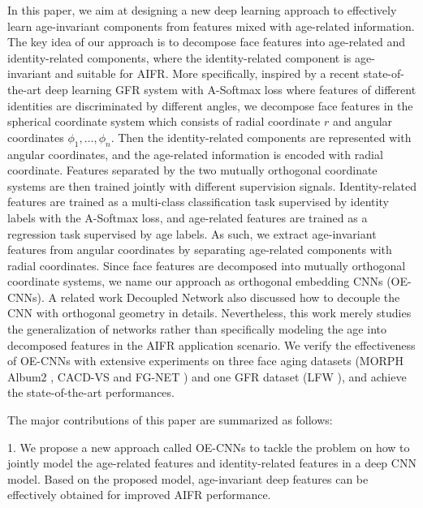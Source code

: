 \documentclass[runningheads]{llncs}
\begin{document}
In this paper, we aim at designing a new deep learning approach to effectively learn age-invariant components from features mixed with age-related information. The key idea of our approach is to decompose face features into age-related and identity-related components, where the identity-related component is age-invariant and suitable for AIFR. More specifically, inspired by a recent state-of-the-art deep learning GFR system with A-Softmax loss \cite{sphereface} where features of different identities are discriminated by different angles, we decompose face features in the spherical coordinate system which consists of radial coordinate $r$ and angular coordinates $\phi_1,\dots,\phi_{n}$. Then the identity-related components are represented with angular coordinates, and the age-related information is encoded with radial coordinate. Features separated by the two mutually orthogonal coordinate systems are then trained jointly with different supervision signals. Identity-related features are trained as a multi-class classification task supervised by identity labels with the A-Softmax loss, and age-related features are trained as a regression task supervised by age labels. As such, we extract age-invariant features from angular coordinates by separating age-related components with radial coordinates. Since face features are decomposed into mutually orthogonal coordinate systems, we name our approach as orthogonal embedding CNNs (OE-CNNs). 
A related work Decoupled Network also discussed how to decouple the CNN with orthogonal geometry in details. Nevertheless, this work merely studies the generalization of networks rather than specifically modeling the age into decomposed features in the AIFR application scenario.
We verify the effectiveness of OE-CNNs with extensive experiments on three face aging datasets (MORPH Album2 \cite{morph}, CACD-VS \cite{cacd} and FG-NET \cite{fgnet}) and one GFR dataset (LFW \cite{lfw}), and achieve the state-of-the-art performances.

The major contributions of this paper are summarized as follows:

1. We propose a new approach called OE-CNNs to tackle the problem on how to jointly model the age-related features and identity-related features in a deep CNN model.
Based on the proposed model, age-invariant deep features can be effectively obtained for improved AIFR performance.
\end{document}
